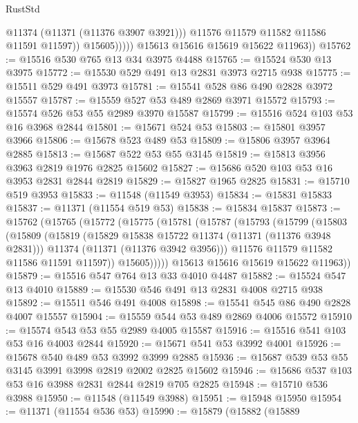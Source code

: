 \begin{lexlean}{RustStd}
\begin{coremodule}
                        @11374
                        (@11371 (@11376 @3907 @3921)))
                      @11576
                      @11579
                      @11582
                      @11586
                      @11591
                      @11597))
                  @15605)))))
        @15613
        @15616
        @15619
        @15622
        @11963))
@15762 := @15516 @530 @765 @13 @34 @3975 @4488
@15765 := @15524 @530 @13 @3975
@15772 := @15530 @529 @491 @13 @2831 @3973 @2715 @938
@15775 := @15511 @529 @491 @3973
@15781 := @15541 @528 @86 @490 @2828 @3972 @15557
@15787 := @15559 @527 @53 @489 @2869 @3971 @15572
@15793 := @15574 @526 @53 @55 @2989 @3970 @15587
@15799 := @15516 @524 @103 @53 @16 @3968 @2844
@15801 := @15671 @524 @53
@15803 := @15801 @3957 @3966
@15806 := @15678 @523 @489 @53
@15809 := @15806 @3957 @3964 @2885
@15813 := @15687 @522 @53 @55 @3145
@15819 := @15813 @3956 @3963 @2819 @1976 @2825 @15602
@15827 := @15686 @520 @103 @53 @16 @3953 @2831 @2844 @2819
@15829 := @15827 @1965 @2825
@15831 := @15710 @519 @3953
@15833 := @11548 (@11549 @3953)
@15834 := @15831 @15833
@15837 := @11371 (@11554 @519 @53)
@15838 := @15834 @15837
@15873 := @15762
    (@15765
      (@15772
        (@15775
          (@15781
            (@15787
              (@15793
                (@15799
                  (@15803
                    (@15809
                      (@15819
                        (@15829 @15838 @15722 @11374 (@11371 (@11376 @3948 @2831)))
                        @11374
                        (@11371 (@11376 @3942 @3956)))
                      @11576
                      @11579
                      @11582
                      @11586
                      @11591
                      @11597))
                  @15605)))))
        @15613
        @15616
        @15619
        @15622
        @11963))
@15879 := @15516 @547 @764 @13 @33 @4010 @4487
@15882 := @15524 @547 @13 @4010
@15889 := @15530 @546 @491 @13 @2831 @4008 @2715 @938
@15892 := @15511 @546 @491 @4008
@15898 := @15541 @545 @86 @490 @2828 @4007 @15557
@15904 := @15559 @544 @53 @489 @2869 @4006 @15572
@15910 := @15574 @543 @53 @55 @2989 @4005 @15587
@15916 := @15516 @541 @103 @53 @16 @4003 @2844
@15920 := @15671 @541 @53 @3992 @4001
@15926 := @15678 @540 @489 @53 @3992 @3999 @2885
@15936 := @15687 @539 @53 @55 @3145 @3991 @3998 @2819 @2002 @2825 @15602
@15946 := @15686 @537 @103 @53 @16 @3988 @2831 @2844 @2819 @705 @2825
@15948 := @15710 @536 @3988
@15950 := @11548 (@11549 @3988)
@15951 := @15948 @15950
@15954 := @11371 (@11554 @536 @53)
@15990 := @15879
    (@15882
      (@15889

\end{coremodule}
\end{lexlean}
